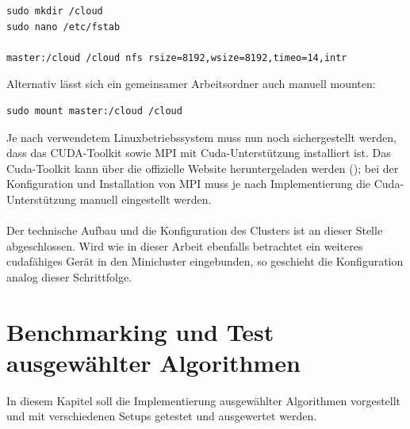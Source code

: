 \documentclass[doktyp=semarbeit, sprache=german]{TUBAFarbeiten}
\begin{document}
\begin{lstlisting}
sudo mkdir /cloud
sudo nano /etc/fstab

master:/cloud /cloud nfs rsize=8192,wsize=8192,timeo=14,intr
\end{lstlisting}
Alternativ lässt sich ein gemeinsamer Arbeitsordner auch manuell mounten:
\begin{lstlisting}
sudo mount master:/cloud /cloud
\end{lstlisting}
Je nach verwendetem Linuxbetriebssystem muss nun noch sichergestellt werden, dass das CUDA-Toolkit sowie MPI mit Cuda-Unterstützung installiert ist. Das Cuda-Toolkit kann über die offizielle Website heruntergeladen werden (\cite{CudaToolkit}); bei der Konfiguration und Installation von MPI muss je nach Implementierung die Cuda-Unterstützung manuell eingestellt werden.
\\\\Der technische Aufbau und die Konfiguration des Clusters ist an dieser Stelle abgeschlossen. Wird wie in dieser Arbeit ebenfalls betrachtet ein weiteres cudafähiges Gerät in den Minicluster eingebunden, so geschieht die Konfiguration analog dieser Schrittfolge.
\section{Benchmarking und Test ausgewählter Algorithmen}
In diesem Kapitel soll die Implementierung ausgewählter Algorithmen vorgestellt und mit verschiedenen Setups getestet und ausgewertet werden.
\end{document}
